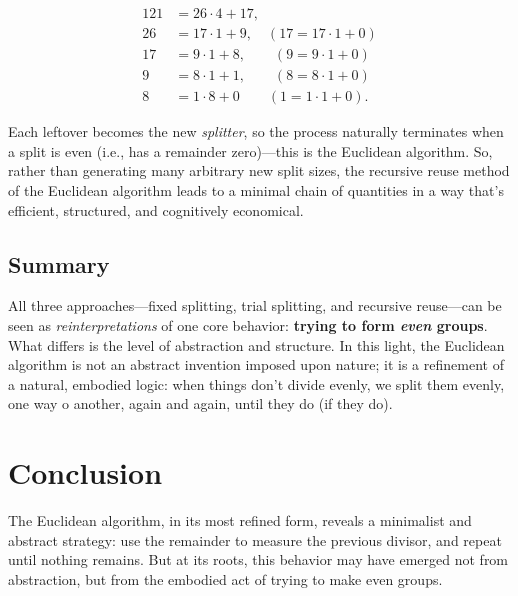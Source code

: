 \documentclass{article}
\begin{document}
\begin{align*}
121 &= 26 \cdot 4 + 17, \\
26 &= 17 \cdot 1 + 9, \quad (17 = 17 \cdot 1 + 0) \\
17 &= 9 \cdot 1 + 8, \qquad (9 = 9 \cdot 1 + 0) \\
9 &= 8 \cdot 1 + 1, \qquad (8 = 8 \cdot 1 + 0) \\
8 &= 1 \cdot 8 + 0 \qquad (1 = 1 \cdot 1 + 0).
\end{align*}

Each leftover becomes the new \textit{splitter}, so the process naturally terminates when a split is even (i.e., has a remainder zero)---this is the Euclidean algorithm. So, rather than generating many arbitrary new split sizes, the recursive reuse method of the Euclidean algorithm leads to a minimal chain of quantities in a way that's efficient, structured, and cognitively economical.

\subsection*{Summary}
All three approaches—fixed splitting, trial splitting, and recursive reuse—can be seen as \textit{reinterpretations} of one core behavior: \textbf{trying to form \textit{even} groups}. What differs is the level of abstraction and structure. In this light, the Euclidean algorithm is not an abstract invention imposed upon nature; it is a refinement of a natural, embodied logic: when things don’t divide evenly, we split them evenly, one way o another, again and again, until they do (if they do).

\section{Conclusion}
The Euclidean algorithm, in its most refined form, reveals a minimalist and abstract strategy: use the remainder to measure the previous divisor, and repeat until nothing remains. But at its roots, this behavior may have emerged not from abstraction, but from the embodied act of trying to make even groups.
\end{document}
